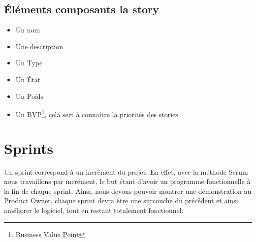 		\subsection{Éléments composants la story}
			\begin{itemize}
				\item Un nom
				\item Une description
				\item Un Type 
				\item Un État
				\item Un Poids 
				\item Un BVP\footnote{Business Value Point}, cela sert à connaître la priorités des stories
			\end{itemize}

	\section{Sprints}\label{sprints}
		Un sprint correspond à un incrément du projet. En effet, avec la méthode Scrum nous travaillons par incrément, le but étant d'avoir un programme fonctionnelle à la fin de chaque sprint. Ainsi, nous 
		devons pouvoir montrer une démonstration au Product Owner, chaque sprint devra être une surcouche du précédent et ainsi améliorer le logiciel, tout en restant totalement fonctionnel.

